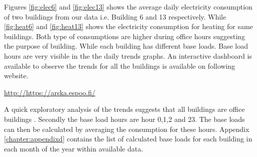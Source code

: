 Figures \ref{fig:elec6} and \ref{fig:elec13} shows the average daily electricity consumption of two buildings from our data i.e. Building 6 and 13 respectively. While  \ref{fig:heat6} and \ref{fig:heat13} shows the electricity consumption for heating for same buildings. Both type of consumptions are higher during office hours suggesting the purpose of building.  While each building has different base loads. Base load hours are very visible in the the daily trends graphs. An interactive dashboard is available to observe the trends for all the buildings is available on following website.

\url{http://https://arska.espoo.fi/}

A quick exploratory analysis of the trends suggests that all buildings are office buildings . Secondly the base load hours are hour 0,1,2 and 23. The base loads can then be calculated by averaging the consumption for these  hours. Appendix \ref{chapter:appendixd} contains the list of calculated base loads for each building in each month of the year within available data.


